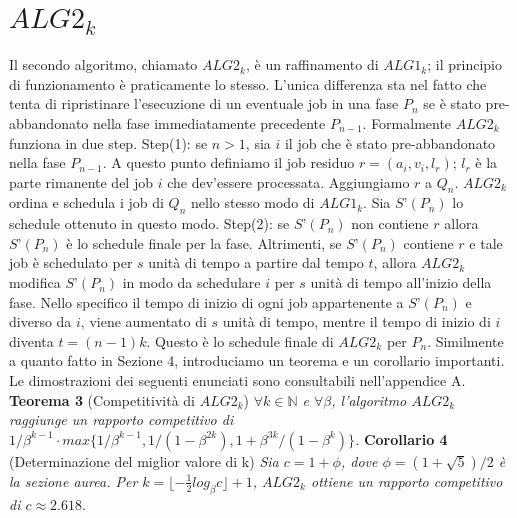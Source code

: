 \documentclass[12pt]{article}
\newcommand*{\N}{\mathbb{N}}
\begin{document}
\section{$ALG2_{k}$}
Il secondo algoritmo, chiamato $ALG2_{k}$, è un raffinamento di $ALG1_{k}$; il principio di funzionamento è praticamente lo stesso. L’unica differenza sta nel fatto che tenta di ripristinare l’esecuzione di un eventuale job in una fase $P_{n}$ se è stato pre-abbandonato nella fase immediatamente precedente $P_{n-1}$. Formalmente $ALG2_{k}$ funziona in due step. \newline
Step(1): se $n > 1$, sia $i$ il job che è stato pre-abbandonato nella fase $P_{n-1}$. A questo punto definiamo il job residuo $r = (a_{i}, v_{i}, l_{r})$; $l_{r}$ è la parte rimanente del job $i$ che dev’essere processata. Aggiungiamo $r$ a $Q_{n}$. $ALG2_{k}$ ordina e schedula i job di $Q_{n}$ nello stesso modo di $ALG1_{k}$. Sia $S’(P_{n})$ lo schedule ottenuto in questo modo. \newline
Step(2): se $S’(P_{n})$ non contiene $r$ allora $S’(P_{n})$ è lo schedule finale per la fase. Altrimenti, se $S’(P_{n})$ contiene $r$ e tale job è schedulato per $s$ unità di tempo a partire dal tempo $t$, allora $ALG2_{k}$ modifica $S’(P_{n})$ in modo da schedulare $i$ per $s$ unità di tempo all’inizio della fase. Nello specifico il tempo di inizio di ogni job appartenente a $S’(P_{n})$ e diverso da $i$, viene aumentato di $s$ unità di tempo, mentre il tempo di inizio di $i$ diventa $t = (n-1)k$. Questo è lo schedule finale di $ALG2_{k}$ per $P_{n}$. 
Similmente a quanto fatto in Sezione 4, introduciamo un teorema e un corollario importanti. Le dimostrazioni dei seguenti enunciati sono consultabili nell'appendice A.
\newline\newline
\textbf{Teorema 3} (Competitività di $ALG2_{k}$)
\textit{$\forall k \in \N$ e $\forall \beta$, l'algoritmo $ALG2_{k}$ raggiunge un rapporto competitivo di $1 / \beta^{k - 1} \cdot max \{1 / \beta^{k - 1}, 1 / (1 - \beta^{2k}), 1 + \beta^{3k} / (1 - \beta^{k})\}$.}
\newline\newline
\textbf{Corollario 4} (Determinazione del miglior valore di k)
\textit{Sia $c = 1 + \phi$, dove $\phi = (1 + \sqrt{5}) / 2$ è la sezione aurea. Per $k = \lfloor -\frac{1}{2} log_{\beta} c \rfloor + 1$, $ALG2_{k}$ ottiene un rapporto competitivo di $c \approx 2.618.$}
\end{document}
